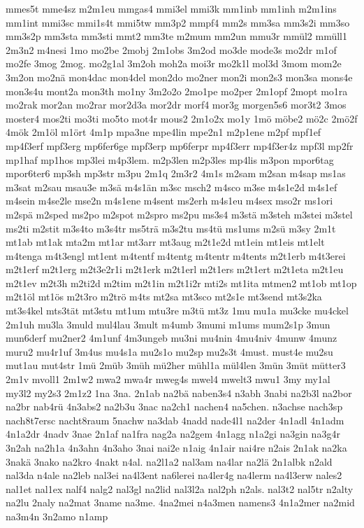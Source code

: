 {mmes5t
mme4sz
m2m1eu
mmgas4
mmi3el
mmi3k
mm1inb
mm1inh
m2m1ins
mm1int
mmi3sc
mmi1s4t
mmi5tw
mm3p2
mmpf4
mm2s
mm3sa
mm3s2i
mm3so
mm3s2p
mm3sta
mm3sti
mmt2
mm3te
m2mum
mm2un
mmu3r
mmül2
mmüll1
2m3n2
m4nesi
1mo
mo2be
2mobj
2m1obs
3m2od
mo3de
mode3s
mo2dr
m1of
mo2fe
3mog
2mog.
mo2g1al
3m2oh
moh2a
moi3r
mo2k1l
mol3d
3mom
mom2e
3m2on
mo2nä
mon4dac
mon4del
mon2do
mo2ner
mon2i
mon2s3
mon3sa
mons4e
mon3s4u
mont2a
mon3th
mo1ny
3m2o2o
2mo1pe
mo2per
2m1opf
2mopt
mo1ra
mo2rak
mor2an
mo2rar
mor2d3a
mor2dr
morf4
mor3g
morgen5s6
mor3t2
3mos
moster4
mos2ti
mo3ti
mo5to
mot4r
mous2
2m1o2x
mo1y
1mö
möbe2
mö2c
2mö2f
4mök
2m1öl
m1ört
4m1p
mpa3ne
mpe4lin
mpe2n1
m2p1ene
m2pf
mpf1ef
mp4f3erf
mpf3erg
mp6fer6ge
mpf3erp
mp6ferpr
mp4f3err
mp4f3er4z
mpf3l
mp2fr
mp1haf
mp1hos
mp3lei
m4p3lem.
m2p3len
m2p3les
mp4lis
m3pon
mpor6tag
mpor6ter6
mp3sh
mp3str
m3pu
2m1q
2m3r2
4m1s
m2sam
m2san
m4sap
ms1as
m3sat
m2sau
msau3e
m3sä
m4s1än
m3sc
msch2
m4sco
m3se
m4s1e2d
m4s1ef
m4sein
m4se2le
mse2n
m4s1ene
m4sent
ms2erh
m4s1eu
m4sex
mso2r
ms1ori
m2spä
m2sped
ms2po
m2spot
m2spro
ms2pu
ms3s4
m3stä
m3steh
m3stei
m3stel
ms2ti
m2stit
m3s4to
m3s4tr
ms5trä
m3s2tu
ms4tü
ms1ums
m2sü
m3sy
2m1t
mt1ab
mt1ak
mta2m
mt1ar
mt3arr
mt3aug
m2t1e2d
mt1ein
mt1eis
mt1elt
m4tenga
m4t3engl
mt1ent
m4tentf
m4tentg
m4tentr
m4tents
m2t1erb
m4t3erei
m2t1erf
m2t1erg
m2t3e2r1i
m2t1erk
m2t1erl
m2t1ers
m2t1ert
m2t1eta
m2t1eu
m2t1ev
m2t3h
m2ti2d
m2tim
m2t1in
m2t1i2r
mti2s
mt1ita
mtmen2
mt1ob
mt1op
m2t1öl
mt1ös
m2t3ro
m2trö
m4ts
mt2sa
mt3sco
mt2s1e
mt3send
mt3s2ka
mt3s4kel
mts3tät
mt3stu
mt1um
mtu3re
m3tü
mt3z
1mu
mu1a
mu3cke
mu4ckel
2m1uh
mu3la
3muld
mul4lau
3mult
m4umb
3mumi
m1ums
mum2s1p
3mun
mun6derf
mu2ner2
4m1unf
4m3ungeb
mu3ni
mu4nin
4mu4niv
4munw
4munz
muru2
mu4r1uf
3m4us
mu4s1a
mu2s1o
mu2sp
mu2s3t
4must.
must4e
mu2su
mut1au
mut4str
1mü
2müb
3müh
mü2her
mühl1a
mül4len
3mün
3müt
mütter3
2m1v
mvoll1
2m1w2
mwa2
mwa4r
mweg4s
mwel4
mwelt3
mwu1
3my
my1al
my3l2
my2s3
2m1z2
1na
3na.
2n1ab
na2bä
naben3s4
n3abh
3nabi
na2b3l
na2bor
na2br
nab4rü
4n3abs2
na2b3u
3nac
na2ch1
nachen4
na5chen.
n3achse
nach3sp
nach8t7ersc
nacht8raum
5nachw
na3dab
4nadd
nade4l1
na2der
4n1adl
4n1adm
4n1a2dr
4nadv
3nae
2n1af
na1fra
nag2a
na2gem
4n1agg
n1a2gi
na3gin
na3g4r
3n2ah
na2h1a
4n3ahn
4n3aho
3nai
nai2e
n1aig
4n1air
nai4re
n2ais
2n1ak
na2ka
3nakä
3nako
na2kro
4nakt
n4al.
na2l1a2
nal3am
na4lar
na2lä
2n1albk
n2ald
nal3da
n4ale
na2leb
nal3ei
na4l3ent
na6lerei
na4ler4g
na4lerm
na4l3erw
nales2
nal1et
nal1ex
nalf4
nalg2
nal3gl
na2lid
nal3l2a
nal2ph
n2als.
nal3t2
nal5tr
n2alty
na2lu
2naly
na2mat
3name
na3me.
4na2mei
n4a3men
namens3
4n1a2mer
na2mid
na3m4n
3n2amo
n1amp
}
